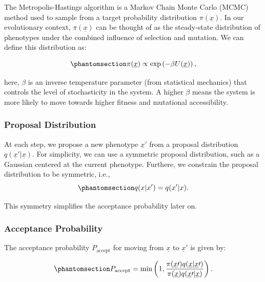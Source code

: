 \documentclass[
]{scrartcl}
\begin{document}
The Metropolis-Hastings algorithm is a Markov Chain Monte Carlo (MCMC)
method used to sample from a target probability distribution
\(\pi(\underline{x})\). In our evolutionary context,
\(\pi(\underline{x})\) can be thought of as the steady-state
distribution of phenotypes under the combined influence of selection and
mutation. We can define this distribution as:

\begin{equation}\phantomsection\label{eq-metropolis-hastings-distribution}{
\pi(\underline{x}) \propto \exp\left(
    -\beta U(\underline{x})
\right),
}\end{equation}

here, \(\beta\) is an inverse temperature parameter (from statistical
mechanics) that controls the level of stochasticity in the system. A
higher \(\beta\) means the system is more likely to move towards higher
fitness and mutational accessibility.

\subsubsection{Proposal Distribution}\label{proposal-distribution}

At each step, we propose a new phenotype \(\underline{x}{\prime}\) from
a proposal distribution \(q(\underline{x}{\prime} | \underline{x})\).
For simplicity, we can use a symmetric proposal distribution, such as a
Gaussian centered at the current phenotype. Furthere, we constrain the
proposal distribution to be symmetric, i.e.,
\begin{equation}\phantomsection\label{eq-metropolis-hastings-proposal-distribution}{
q(x | x') = q(x' | x).
}\end{equation}

This symmetry simplifies the acceptance probability later on.

\subsubsection{Acceptance Probability}\label{acceptance-probability}

The acceptance probability \(P_{\text{accept}}\) for moving from
\(\underline{x}\) to \(\underline{x}{\prime}\) is given by:

\begin{equation}\phantomsection\label{eq-metropolis-hastings-acceptance-probability}{
P_{\text{accept}} = 
\min\left(1, 
    \frac{\pi(\underline{x}{\prime}) q(\underline{x} | \underline{x}{\prime})}
    {\pi(\underline{x}) q(\underline{x}{\prime} | \underline{x})}
\right).
}\end{equation}
\end{document}
